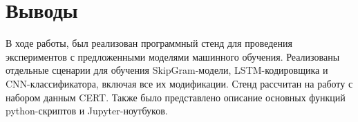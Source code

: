 \section{Выводы}

В ходе работы, был реализован программный стенд для проведения экспериментов с предложенными моделями машинного обучения. Реализованы отдельные сценарии для обучения SkipGram-модели, LSTM-кодировщика и CNN-классификатора, включая все их модификации. Стенд рассчитан на работу с набором данным CERT. Также было представлено описание основных функций python-скриптов и Jupyter-ноутбуков.